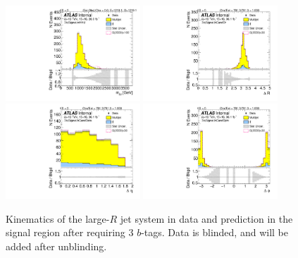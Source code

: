 \begin{figure}[htbp!]
\begin{center}
\includegraphics[angle=270, width=0.45\textwidth]{./figures/boosted/Signal/b77_ThreeTag_Signal_mHH_l_blind.pdf}
\includegraphics[angle=270, width=0.45\textwidth]{./figures/boosted/Signal/b77_ThreeTag_Signal_hCandDr_blind.pdf}\\
\includegraphics[angle=270, width=0.45\textwidth]{./figures/boosted/Signal/b77_ThreeTag_Signal_hCandDeta_blind.pdf}
\includegraphics[angle=270, width=0.45\textwidth]{./figures/boosted/Signal/b77_ThreeTag_Signal_hCandDphi_blind.pdf}
  \caption{Kinematics of the large-$R$ jet system in data and prediction in the signal region after requiring 3 $b$-tags. Data is blinded, and will be added after unblinding. }
  \label{fig:boosted-3b-signal-blind-ak10-system}
\end{center}
\end{figure}

